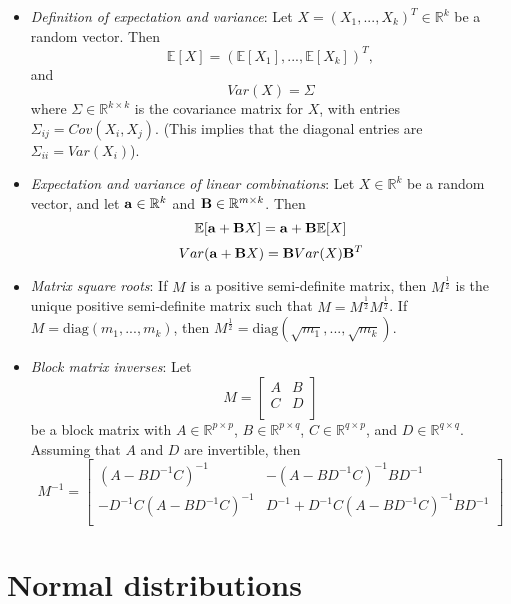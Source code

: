 \documentclass[11pt]{article}
\begin{document}
\begin{itemize}
\item \textit{Definition of expectation and variance}: Let $X = (X_1,...,X_k)^T \in \mathbb{R}^k$ be a random vector. Then 
$$\mathbb{E}[X] = (\mathbb{E}[X_1],...,\mathbb{E}[X_k])^T,$$
and
$$Var(X) = \Sigma$$
where $\Sigma \in \mathbb{R}^{k \times k}$ is the covariance matrix for $X$, with entries $\Sigma_{ij} = Cov(X_i, X_j)$. (This implies that the diagonal entries are $\Sigma_{ii} = Var(X_i)$).

\item \textit{Expectation and variance of linear combinations}: Let $X \in \mathbb{R}^k$ be a random vector, and let ${\bf a} \in \mathbb{R}^k$ and ${\bf B} \in \mathbb{R}^{m \times k}$. Then
$$\mathbb{E}[{\bf a} + {\bf B} X] = {\bf a} + {\bf B} \mathbb{E}[X]$$
$$Var({\bf a} + {\bf B} X) = {\bf B} Var(X) {\bf B}^T$$

\item \textit{Matrix square roots}: If $M$ is a positive semi-definite matrix, then $M^{\frac{1}{2}}$ is the unique positive semi-definite matrix such that $M = M^{\frac{1}{2}} M^{\frac{1}{2}}$. If $M = \text{diag}(m_1,...,m_k)$, then $M^{\frac{1}{2}} = \text{diag}(\sqrt{m_1},...,\sqrt{m_k})$.

\item \textit{Block matrix inverses}: Let 
$$M = \begin{bmatrix}
A & B \\
C & D\\
\end{bmatrix}$$
be a block matrix with $A \in \mathbb{R}^{p \times p}$, $B \in \mathbb{R}^{p \times q}$, $C \in \mathbb{R}^{q \times p}$, and $D \in \mathbb{R}^{q \times q}$. Assuming that $A$ and $D$ are invertible, then
$$M^{-1} = \begin{bmatrix}
(A - BD^{-1}C)^{-1} & -(A - BD^{-1}C)^{-1}BD^{-1} \\
-D^{-1}C(A - BD^{-1}C)^{-1} & D^{-1} + D^{-1}C(A - BD^{-1}C)^{-1}BD^{-1}\\
\end{bmatrix}$$
\end{itemize}

\section*{Normal distributions}
\end{document}

